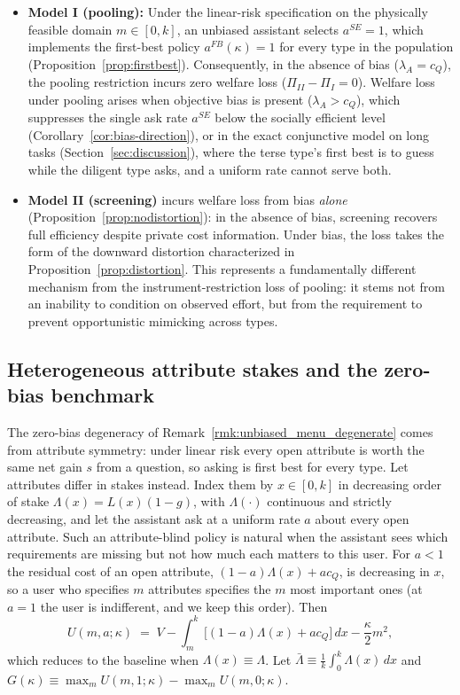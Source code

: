 \documentclass[11pt]{article}
\begin{document}
\begin{itemize}[leftmargin=*]
\item \textbf{Model I (pooling):} Under the linear-risk specification on the physically feasible domain $m \in [0, k]$, an unbiased assistant selects $a^{SE} = 1$, which implements the first-best policy $a^{FB}(\kappa) = 1$ for every type in the population (Proposition~\ref{prop:firstbest}). Consequently, in the absence of bias ($\lambda_A = c_Q$), the pooling restriction incurs zero welfare loss ($\Pi_{II} - \Pi_I = 0$). Welfare loss under pooling arises when objective bias is present ($\lambda_A > c_Q$), which suppresses the single ask rate $a^{SE}$ below the socially efficient level (Corollary~\ref{cor:bias-direction}), or in the exact conjunctive model on long tasks (Section~\ref{sec:discussion}), where the terse type's first best is to guess while the diligent type asks, and a uniform rate cannot serve both.
\item \textbf{Model II (screening)} incurs welfare loss from bias \emph{alone}
(Proposition~\ref{prop:nodistortion}): in the absence of bias, screening recovers full
efficiency despite private cost information. Under bias, the loss takes the form of the
downward distortion characterized in Proposition~\ref{prop:distortion}.
This represents a fundamentally different mechanism from the instrument-restriction loss of pooling: it stems
not from an inability to condition on observed effort, but from the requirement to
prevent opportunistic mimicking across types.
\end{itemize}

\subsection{Heterogeneous attribute stakes and the zero-bias benchmark}
\label{sec:hetstakes}

The zero-bias degeneracy of Remark~\ref{rmk:unbiased_menu_degenerate} comes from attribute symmetry: under linear risk every open attribute is worth the same net gain $s$ from a question, so asking is first best for every type. Let attributes differ in stakes instead. Index them by $x \in [0,k]$ in decreasing order of stake $\Lambda(x) = L(x)(1-g)$, with $\Lambda(\cdot)$ continuous and strictly decreasing, and let the assistant ask at a uniform rate $a$ about every open attribute. Such an attribute-blind policy is natural when the assistant sees which requirements are missing but not how much each matters to this user. For $a < 1$ the residual cost of an open attribute, $(1-a)\Lambda(x) + a c_Q$, is decreasing in $x$, so a user who specifies $m$ attributes specifies the $m$ most important ones (at $a = 1$ the user is indifferent, and we keep this order). Then
\[
U(m,a;\kappa) \;=\; V - \int_m^k \big[(1-a)\Lambda(x) + a c_Q\big]\,dx - \frac{\kappa}{2}m^2,
\]
which reduces to the baseline when $\Lambda(x) \equiv \Lambda$. Let $\bar\Lambda \equiv \frac{1}{k}\int_0^k \Lambda(x)\,dx$ and $G(\kappa) \equiv \max_m U(m,1;\kappa) - \max_m U(m,0;\kappa)$.
\end{document}
